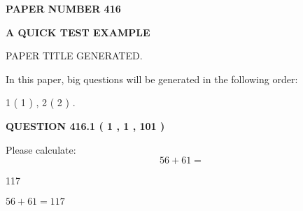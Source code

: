 \documentclass[12pt]{article}
\begin{document}
 
 
 
 
   
   
\newpage 
\setcounter{page}{ 
   416001 } 
   
   
   
   
 {\textbf{ \Large{ PAPER NUMBER  416  }}}
   
   
\vspace{0.2in}
   
   
   
   
   
   
   
   
 \vspace{0.2in}
{\LARGE {\textbf{ A QUICK TEST EXAMPLE}}}
   
   
 PAPER TITLE GENERATED.
   
   
   
\vspace{0.2in}
   
In this paper, big questions will be generated in the following order: 
   
   
   1 ( 1 )
 ,
   2 ( 2 )
 .
  
\vspace{0.2in}
  
{\textbf{\Large{QUESTION
416.1 
 ( 1 , 1 , 101 )
}}}
  
  
 
Please calculate:
\begin{equation}
56 +  %
61 = \nonumber
\end{equation}
 
 
 
\noindent{}
 
 

117
 
 
\noindent{}
 
 

 
 
 
\noindent{}
 
 

$ %
56 +  %
61=   %
117$
 
 
\noindent{}
 
\end{document}
